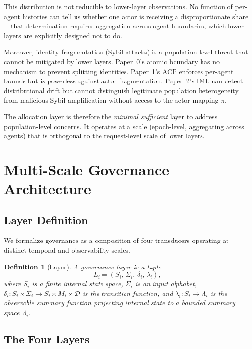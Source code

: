 \documentclass[11pt]{article}
\newtheorem{definition}[theorem]{Definition}
\newcommand{\State}[1]{S_{#1}}
\newcommand{\Trans}[1]{\delta_{#1}}
\newcommand{\Sum}[1]{\lambda_{#1}}
\newcommand{\Layer}[1]{L_{#1}}
\newcommand{\Dec}{\mathcal{D}}
\begin{document}
This distribution is not reducible to lower-layer observations. No function of per-agent histories can tell us whether one actor is receiving a disproportionate share---that determination requires aggregation across agent boundaries, which lower layers are explicitly designed not to do.

Moreover, identity fragmentation (Sybil attacks) is a population-level threat that cannot be mitigated by lower layers. Paper~0's atomic boundary has no mechanism to prevent splitting identities. Paper~1's ACP enforces per-agent bounds but is powerless against actor fragmentation. Paper~2's IML can detect distributional drift but cannot distinguish legitimate population heterogeneity from malicious Sybil amplification without access to the actor mapping $\pi$.

The allocation layer is therefore the \emph{minimal sufficient} layer to address population-level concerns. It operates at a scale (epoch-level, aggregating across agents) that is orthogonal to the request-level scale of lower layers.

\section{Multi-Scale Governance Architecture}
\label{sec:arch}

\subsection{Layer Definition}

We formalize governance as a composition of four transducers operating at distinct temporal and observability scales.

\begin{definition}[Layer]
\label{def:layer}
A \emph{governance layer} is a tuple
\[
  \Layer{i} = (\State{i},\, \Sigma_i,\, \Trans{i},\, \Sum{i}),
\]
where $\State{i}$ is a finite internal state space, $\Sigma_i$ is an input alphabet, $\Trans{i}: \State{i} \times \Sigma_i \to \State{i} \times M_i \times \Dec$ is the transition function, and $\Sum{i}: \State{i} \to \Lambda_i$ is the \emph{observable summary} function projecting internal state to a bounded summary space $\Lambda_i$.
\end{definition}

\subsection{The Four Layers}
\end{document}
